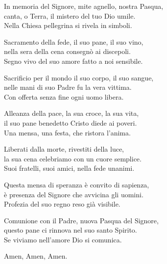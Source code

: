 
\strofa In memoria del Signore, mite agnello, nostra Pasqua,\\
canta, o Terra, il mistero del tuo Dio umile.\\
Nella Chiesa pellegrina si rivela in simboli.

\spazio

\strofa Sacramento della fede, il suo pane, il suo vino,\\
nella sera della cena consegnò ai discepoli.\\
Segno vivo del suo amore fatto a noi sensibile.

\spazio

\strofa Sacrificio per il mondo il suo corpo, il suo sangue,\\
nelle mani di suo Padre fu la vera vittima.\\
Con offerta senza fine ogni uomo libera.

\spazio

\strofa Alleanza della pace, la sua croce, la sua vita,\\
il suo pane benedetto Cristo diede ai poveri.\\
Una mensa, una festa, che ristora l'anima.

\spazio

\strofa Liberati dalla morte, rivestiti della luce,\\
la sua cena celebriamo con un cuore semplice.\\
Suoi fratelli, suoi amici, nella fede unanimi.

\spazio

\strofa Questa mensa di speranza è convito di sapienza,\\
è presenza del Signore che avvicina gli uomini.\\
Profezia del suo regno reso già visibile.

\spazio

\strofa Comunione con il Padre, nuova Pasqua del Signore,\\
questo pane ci rinnova nel suo santo Spirito.\\
Se viviamo nell'amore Dio si comunica.

\spazio

Amen, Amen, Amen.
